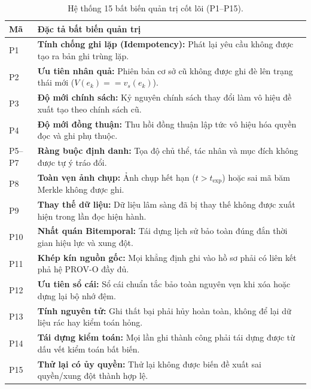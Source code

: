 \documentclass[11pt]{article}
\begin{document}
\begin{table}[t]
\caption{Hệ thống 15 bất biến quản trị cốt lõi (P1--P15).}
\label{tab:inv}
\centering\small
\begin{tabularx}{\textwidth}{p{}X}
\toprule
Mã & Đặc tả bất biến quản trị \\
\midrule
P1 & \textbf{Tính chống ghi lặp (Idempotency):} Phát lại yêu cầu không được tạo ra bản ghi trùng lặp.\\
P2 & \textbf{Ưu tiên nhân quả:} Phiên bản cơ sở cũ không được ghi đè lên trạng thái mới ($V(e_k) == v_s(e_k)$).\\
P3 & \textbf{Độ mới chính sách:} Kỷ nguyên chính sách thay đổi làm vô hiệu đề xuất tạo theo chính sách cũ.\\
P4 & \textbf{Độ mới đồng thuận:} Thu hồi đồng thuận lập tức vô hiệu hóa quyền đọc và ghi phụ thuộc.\\
P5--P7 & \textbf{Ràng buộc định danh:} Tọa độ chủ thể, tác nhân và mục đích không được tự ý tráo đổi.\\
P8 & \textbf{Toàn vẹn ảnh chụp:} Ảnh chụp hết hạn ($t > t_{\text{exp}}$) hoặc sai mã băm Merkle không được ghi.\\
P9 & \textbf{Thay thế dữ liệu:} Dữ liệu lâm sàng đã bị thay thế không được xuất hiện trong lần đọc hiện hành.\\
P10 & \textbf{Nhất quán Bitemporal:} Tái dựng lịch sử bảo toàn đúng đắn thời gian hiệu lực và xung đột.\\
P11 & \textbf{Khép kín nguồn gốc:} Mọi khẳng định ghi vào hồ sơ phải có liên kết phả hệ PROV-O đầy đủ.\\
P12 & \textbf{Ưu tiên sổ cái:} Sổ cái chuẩn tắc bảo toàn nguyên vẹn khi xóa hoặc dựng lại bộ nhớ đệm.\\
P13 & \textbf{Tính nguyên tử:} Ghi thất bại phải hủy hoàn toàn, không để lại dữ liệu rác hay kiểm toán hỏng.\\
P14 & \textbf{Tái dựng kiểm toán:} Mọi lần ghi thành công phải tái dựng được từ dấu vết kiểm toán bất biến.\\
P15 & \textbf{Thử lại có ủy quyền:} Thử lại không được biến đề xuất sai quyền/xung đột thành hợp lệ.\\
\bottomrule
\end{tabularx}
\end{table}
\end{document}
